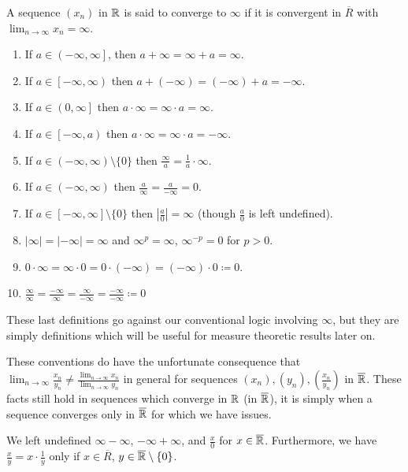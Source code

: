 \begin{remark}
	A sequence \(\left( x_{n} \right) \) in \(\mathbb{R}\) is said to converge to \(\infty\) if it is convergent in \(\overline{R}\) with \(\lim_{n \to \infty}x_{n} = \infty\).
\end{remark}
\begin{definition}[]
	\begin{enumerate}
		\item If \(a \in \left( -\infty, \infty \right]\), then \(a + \infty = \infty + a = \infty \).
		\item If \(a \in \left[ -\infty, \infty \right) \) then \(a + \left( -\infty \right) = \left( -\infty \right) + a = -\infty  \).
		\item If \(a \in \left( 0, \infty \right] \) then \(a \cdot \infty = \infty \cdot a = \infty\).
			\item If \(a \in \left[ -\infty, a \right) \) then \(a \cdot \infty = \infty \cdot a = -\infty\).
			\item If \(a \in \left( -\infty, \infty \right) \setminus \{0\}  \) then \(\frac{\infty}{a} = \frac{1}{a} \cdot \infty\).
			\item If \(a \in \left( -\infty, \infty \right) \) then \(\frac{a}{\infty} = \frac{a}{-\infty} = 0\).
			\item If \(a \in \left[ -\infty, \infty \right] \setminus \{0\}  \) then \(\left| \frac{a}{0} \right| = \infty\) (though \(\frac{a}{0}\) is left undefined).
			\item \(\left| \infty \right|=  \left| -\infty \right| = \infty \) and \(\infty^{p} = \infty\), \(\infty^{-p} = 0\) for \(p > 0 \).
			\item \(0 \cdot \infty = \infty \cdot 0 = 0 \cdot \left( -\infty \right) = \left( -\infty \right) \cdot 0 \coloneqq 0  \).
				\item \(\frac{\infty}{\infty} = \frac{-\infty}{\infty} = \frac{\infty}{-\infty} = \frac{-\infty}{-\infty} \coloneqq 0\)
	\end{enumerate}
	These last definitions go against our conventional logic involving \(\infty\), but they are simply definitions which will be useful for measure theoretic results later on.

\end{definition}
These conventions do have the unfortunate consequence that \(\lim_{n \to \infty} \frac{x_{n}}{y_{n}} \neq \frac{\lim_{n \to \infty}x_{n}}{\lim_{n \to \infty}y_{n}}\) in general for sequences \(\left( x_{n} \right), \left( y_{n} \right), \left( \frac{x_{n}}{y_{n}} \right)  \) in \(\overline{\mathbb{R}}\). These facts still hold in sequences which converge in \(\mathbb{R}\) (in \(\overline{\mathbb{R}}\)), it is simply when a sequence converges only in \(\overline{\mathbb{R}}\) for which we have issues.
\begin{remark}
	We left undefined \(\infty - \infty\), \(-\infty + \infty\), and \(\frac{x}{0}\) for \(x \in \overline{\mathbb{R}}\). Furthermore, we have \(\frac{x}{y} = x \cdot \frac{1}{y}\) only if \(x \in \overline{R}\), \(y \in \overline{\mathbb{R}}\setminus \{0\} \).
\end{remark}
